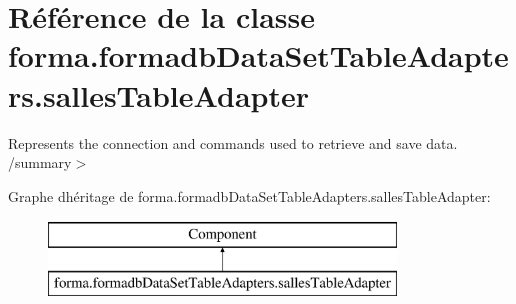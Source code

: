 \hypertarget{classforma_1_1formadb_data_set_table_adapters_1_1salles_table_adapter}{}\section{Référence de la classe forma.\+formadb\+Data\+Set\+Table\+Adapters.\+salles\+Table\+Adapter}
\label{classforma_1_1formadb_data_set_table_adapters_1_1salles_table_adapter}


Represents the connection and commands used to retrieve and save data. /summary$>$  


Graphe d\textquotesingle{}héritage de forma.\+formadb\+Data\+Set\+Table\+Adapters.\+salles\+Table\+Adapter\+:\begin{figure}[H]
\begin{center}
\leavevmode
\includegraphics[height=2.000000cm]{classforma_1_1formadb_data_set_table_adapters_1_1salles_table_adapter}
\end{center}
\end{figure}

